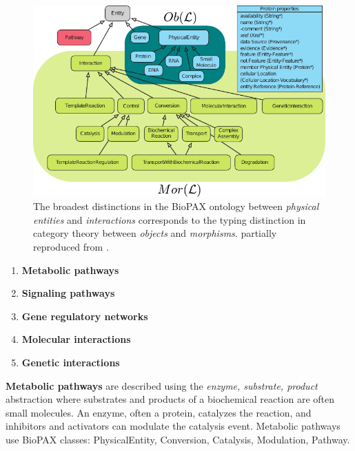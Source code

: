 \begin{frame}
\begin{figure}
\noindent\includegraphics[width=0.8\framewidth]{fig/biopaxschemacat.pdf}
\caption{The broadest distinctions in the BioPAX ontology between {\it physical entities} and {\it interactions} corresponds to the typing distinction in category theory between {\it objects} and {\it morphisms}. partially reproduced from \cite{Demir2010}.}
\label{fig:biopaxschema}
\end{figure}
\end{frame}

\begin{frame}
\begin{enumerate}
\item \textbf{Metabolic pathways}
\item \textbf{Signaling pathways}
\item \textbf{Gene regulatory networks}
\item \textbf{Molecular interactions}
\item \textbf{Genetic interactions}
\end{enumerate}
\end{frame}

\begin{frame}
\textbf{Metabolic pathways} are described using the {\it enzyme, substrate,
product} abstraction where substrates and products of a biochemical reaction are often small molecules. An enzyme, often a protein, catalyzes the reaction, and inhibitors and activators can modulate the catalysis event. Metabolic pathways use BioPAX classes: PhysicalEntity, Conversion, Catalysis, Modulation, Pathway.
\end{frame}

